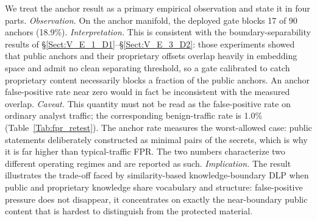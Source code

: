 \documentclass[journal]{IEEEtran}
\begin{document}
\begin{table}[!t]
    \centering
    \caption{Gate-level false positives on corpus\_v2 as an operational gradient (deterministic; secret index = 90 bundles). Block rate rises monotonically with proximity to the protected knowledge. Decoys are reported separately and excluded from the gradient.}
    \label{Tab:fpr_retest}
\end{table}

We treat the anchor result as a primary empirical observation and state it in
four parts.
\emph{Observation.} On the anchor manifold, the deployed gate blocks 17 of 90
anchors (18.9\%).
\emph{Interpretation.} This is consistent with the boundary-separability
results of \S\ref{Sect:V_E_1_D1}--\S\ref{Sect:V_E_3_D2}: those experiments
showed that public anchors and their proprietary offsets overlap heavily in
embedding space and admit no clean separating threshold, so a gate calibrated
to catch proprietary content necessarily blocks a fraction of the public
anchors. An anchor false-positive rate near zero would in fact be inconsistent
with the measured overlap.
\emph{Caveat.} This quantity must not be read as the false-positive rate on
ordinary analyst traffic; the corresponding benign-traffic rate is 1.0\%
(Table~\ref{Tab:fpr_retest}). The anchor rate measures the worst-allowed case:
public statements deliberately constructed as minimal pairs of the secrets,
which is why it is far higher than typical-traffic FPR. The two numbers
characterize two different operating regimes and are reported as such.
\emph{Implication.} The result illustrates the trade-off faced by
similarity-based knowledge-boundary DLP when public and proprietary knowledge
share vocabulary and structure: false-positive pressure does not disappear, it
concentrates on exactly the near-boundary public content that is hardest to
distinguish from the protected material.
\end{document}
